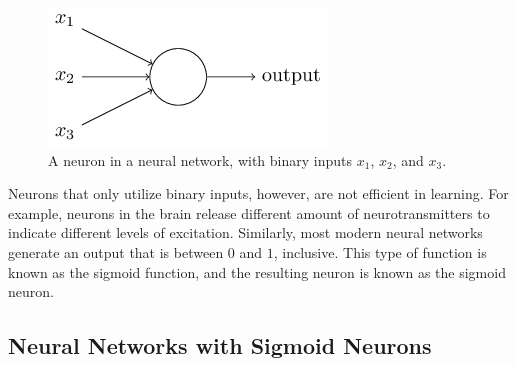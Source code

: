 \begin{figure}[htbp!]
    \centering
    \includegraphics[scale=1.0]{pictures/NeuralNetworks/sigmoidNeuron.png}
        \caption{A neuron in a neural network, with binary inputs $x_1$, $x_2$, and $x_3$.}
    \label{fig:sigmoidNeuron}
\end{figure}

Neurons that only utilize binary inputs, however, are not efficient in learning.
For example, neurons in the brain release different amount of neurotransmitters to indicate different levels of excitation.
Similarly, most modern neural networks generate an output that is between $0$ and $1$, inclusive.
This type of function is known as the sigmoid function, and the resulting neuron is known as the sigmoid neuron. 

\subsection{Neural Networks with Sigmoid Neurons}

